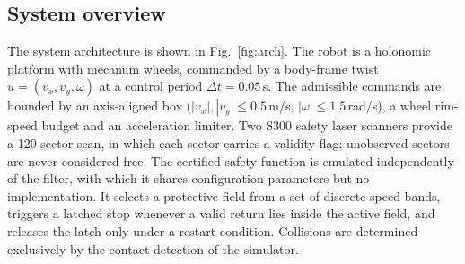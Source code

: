 \documentclass[conference]{IEEEtran}
\begin{document}
\subsection{System overview}
The system architecture is shown in Fig.~\ref{fig:arch}. The robot is a holonomic platform with
mecanum wheels, commanded by a body-frame twist $u=(v_x,v_y,\omega)$ at a control period
$\Delta t=0.05$\,s. The admissible commands are bounded by an axis-aligned box
($|v_x|,|v_y|\le0.5$\,m/s, $|\omega|\le1.5$\,rad/s), a wheel rim-speed budget and an acceleration
limiter. Two S300 safety laser scanners provide a 120-sector scan, in which each sector carries a
validity flag; unobserved sectors are never considered free. The certified safety function is emulated
independently of the filter, with which it shares configuration parameters but no implementation. It
selects a protective field from a set of discrete speed bands, triggers a latched stop whenever a valid
return lies inside the active field, and releases the latch only under a restart condition. Collisions
are determined exclusively by the contact detection of the simulator.
\end{document}
